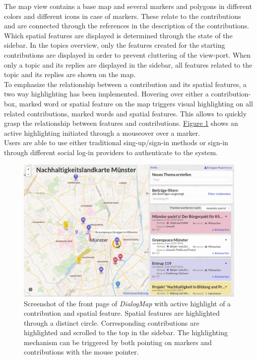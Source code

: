 The map view contains a base map and several markers and polygons in different colors and different icons in case of markers. These relate to the contributions and are connected through the references in the description of the contributions. Which spatial features are displayed is determined through the state of the sidebar. In the topics overview, only the features created for the starting contributions are displayed in order to prevent cluttering of the view-port. When only a topic and its replies are displayed in the sidebar, all features related to the topic and its replies are shown on the map. \\
To emphasize the relationship between a contribution and its spatial features, a two way highlighting has been implemented. Hovering over either a contribution-box, marked word or spatial feature on the map triggers visual highlighting on all related contributions, marked words and spatial features. This allows to quickly grasp the relationship between features and contributions. \hyperref[fig:screenshot]{Figure \ref{fig:screenshot}} shows an active highlighting initiated through a mouseover over a marker.\\
Users are able to use either traditional sing-up/sign-in methods or sign-in through different social log-in providers to authenticate to the system.
\begin{figure}[!h]
    \centering
    \includegraphics[width=1\columnwidth]{images/screenshot}
    \caption{Screenshot of the front page of \textit{DialogMap} with active highlight of a contribution and spatial feature. Spatial features are highlighted through a distinct circle. Corresponding contributions are highlighted and scrolled to the top in the sidebar. The highlighting mechanism can be triggered by both pointing on markers and contributions with the mouse pointer.}
    \label{fig:screenshot}
\end{figure}

